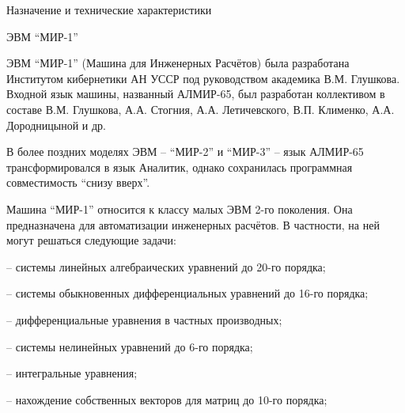 \documentclass[11pt]{article}
\begin{document}







 


Назначение и технические
характеристики 

ЭВМ “МИР-1”

ЭВМ “МИР-1” (Машина для Инженерных
Расчётов) была разработана Институтом
кибернетики АН УССР под руководством
академика В.М. Глушкова. Входной язык
машины, названный АЛМИР-65, был
разработан коллективом в составе В.М.
Глушкова, А.А. Стогния, А.А.
Летичевского, В.П. Клименко, А.А.
Дородницыной и др.

В более поздних моделях ЭВМ – “МИР-2” и
“МИР-3” – язык АЛМИР-65
трансформировался в язык Аналитик,
однако сохранилась программная
совместимость “снизу вверх”.

Машина “МИР-1” относится к классу
малых ЭВМ 2-го поколения. Она
предназначена для автоматизации
инженерных расчётов. В частности, на
ней могут решаться следующие задачи:

– системы линейных алгебраических
уравнений до 20-го порядка;

– системы обыкновенных
дифференциальных уравнений до 16-го
порядка;

–\- дифференциальные уравнения в
частных производных;

– системы нелинейных уравнений до 6-го
порядка;

– интегральные уравнения;

– нахождение собственных векторов для
матриц до 10-го порядка;
\end{document}
